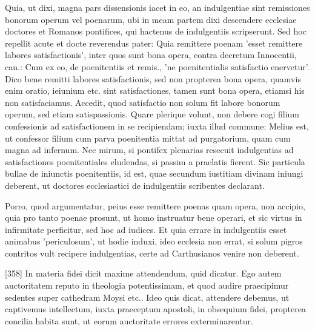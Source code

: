 Quia, ut dixi, magna pars dissensionis iacet in eo, an indulgentiae sint remissiones bonorum operum vel poenarum, ubi in meam partem dixi descendere ecclesiae doctores et Romanos pontifices, qui hactenus de indulgentiis scripserunt. Sed hoc repellit acute et docte reverendus pater: Quia remittere poenam 'esset remittere labores satisfactionis', inter quos sunt bona opera, contra decretum Innocentii, can.: Cum ex eo, de poenitentiis et remis., 'ne poenitentialis satisfactio enervetur'. Dico bene remitti labores satisfactionis, sed non propterea bona opera, quamvis enim oratio, ieiunium etc. sint satisfactiones, tamen sunt bona opera, etiamsi his non satisfaciamus. Accedit, quod satisfactio non solum fit labore bonorum operum, sed etiam satispassionis. Quare plerique volunt, non debere cogi filium confessionis ad satisfactionem in se recipiendam; iuxta illud commune: Melius est, ut confessor filium cum parva poenitentia mittat ad purgatorium, quam cum magna ad infernum. Nec mirum, si pontifex plenarias resecuit indulgentias ad satisfactiones poenitentiales eludendas, si passim a praelatis fierent. Sic particula bullae de iniunctis poenitentiis, id est, quae secundum iustitiam divinam iniungi deberent, ut doctores ecclesiastici de indulgentiis scribentes declarant.

Porro, quod argumentatur, peius esse remittere poenas quam opera, non accipio, quia pro tanto poenae prosunt, ut homo instruatur bene operari, et sic virtus in infirmitate perficitur, sed hoc ad iudices. Et quia errare in indulgentiis esset animabus 'periculosum', ut hodie induxi, ideo ecclesia non errat, si solum pigros contritos vult recipere indulgentias, certe ad Carthusianos venire non deberent.

[358] In materia fidei dicit maxime attendendum, quid dicatur. Ego autem auctoritatem reputo in theologia potentissimam, et quod audire praecipimur sedentes super cathedram Moysi etc.. Ideo quis dicat, attendere debemus, ut captivemus intellectum, iuxta praeceptum apostoli, in obsequium fidei, propterea concilia habita sunt, ut eorum auctoritate errores exterminarentur.

